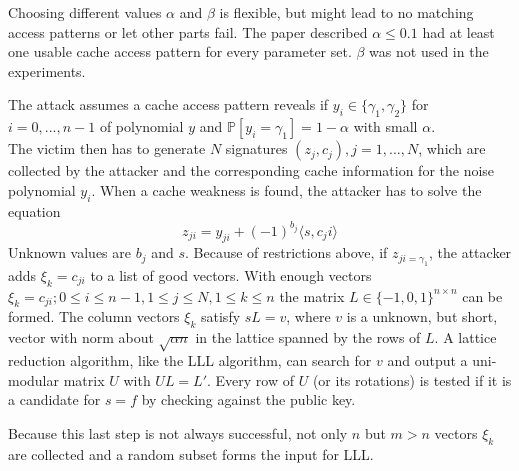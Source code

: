 Choosing different values $\alpha$ and $\beta$ is flexible, but might lead to no matching access patterns or let other parts fail. The paper described $\alpha \le 0.1$ had at least one usable cache access pattern for every parameter set. $\beta$ was not used in the experiments.

The attack assumes a cache access pattern reveals if $y_i \in \{\gamma_1, \gamma_2\}$ for $i = 0,...,n-1$ of polynomial $y$ and $\mathbb{P}[y_i = \gamma_1] = 1- \alpha$ with small $\alpha$. \\
The victim then has to generate $N$ signatures $(z_j, c_j), j= 1,...,N$, which are collected by the attacker and the corresponding cache information for the noise polynomial $y_i$. When a cache weakness is found, the attacker has to solve the equation 
\begin{equation*}
	z_{ji} = y_{ji} + (-1)^{b_j}\langle s,c_ji \rangle
\end{equation*}
Unknown values are $b_j$ and $s$. Because of restrictions above, if $z_{ji = \gamma_1}$, the attacker adds $\xi_k = c_{ji}$ to a list of good vectors. With enough vectors $\xi_k = c_{ji}; 0 \le i \le n-1, 1 \le j \le N, 1 \le k \le n$ the matrix $L \in \{-1,0,1\}^{n \times n}$ can be formed. The column vectors $\xi_k$ satisfy $sL = v$, where $v$ is a unknown, but short, vector with norm about $\sqrt{\alpha n}$ in the lattice spanned by the rows of $L$. A lattice reduction algorithm, like the \ac{LLL} algorithm, can search for $v$ and output a uni-modular matrix $U$ with $UL = L'$. Every row of $U$ (or its rotations) is tested if it is a candidate for $s=f$ by checking against the public key.

Because this last step is not always successful, not only $n$ but $m>n$ vectors $\xi_k$ are collected and a random subset forms the input for LLL.

